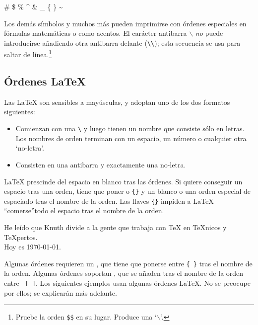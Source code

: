 \begin{example}
\# \$ \% \^{} \& \_ \{ \} \~{} 
\end{example}

Los demás símbolos y muchos más pueden imprimirse con órdenes especiales en fórmulas matemáticas o como acentos.  El carácter antibarra $\backslash$ \emph{no} puede introducirse añadiendo otra antibarra delante (\verb|\\|); esta secuencia se usa para saltar de línea.\footnote{Pruebe la orden \texttt{\$}\texttt{\$} en su lugar.  Produce una `$\backslash$'.}

\subsection{Órdenes \LaTeX{}}

Las  \LaTeX{} son sensibles a mayúsculas, y adoptan uno de los dos formatos siguientes:

\begin{itemize}
\item Comienzan con una  \verb|\| y luego tienen un
 nombre que consiste sólo en letras.  Los nombres de orden terminan
 con un espacio, un número o cualquier otra `no-letra'.
\item Consisten en una antibarra y exactamente una no-letra.
\end{itemize}

%
%

%
%
\label{whitespace}

\LaTeX{} prescinde del espacio en blanco tras las órdenes.  Si quiere conseguir un espacio tras una orden, tiene que poner o \verb|{}| y un blanco o una orden especial de espaciado tras el nombre de la orden.  Las llaves \verb|{}| impiden a \LaTeX{} ``comerse''todo el espacio tras el nombre de la orden.

\begin{example}
He leído que Knuth divide a la
gente que trabaja con \TeX{} en
\TeX{}nicos y \TeX pertos.\\
Hoy es \today.
\end{example}

Algunas órdenes requieren un , que tiene que ponerse entre  \verb|{ }| tras el nombre de la orden.  Algunas órdenes soportan , que se añaden tras el nombre de la orden entre ~\verb|[ ]|.  Los siguientes ejemplos usan algunas órdenes \LaTeX{}.  No se preocupe por ellos; se explicarán más adelante.

